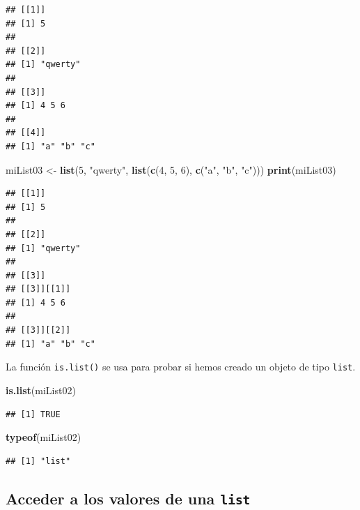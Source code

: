 \documentclass[]{book}
\newenvironment{Shaded}{\begin{snugshade}}{\end{snugshade}}
\newcommand{\KeywordTok}[1]{\textcolor[rgb]{0.13,0.29,0.53}{\textbf{#1}}}
\newcommand{\DecValTok}[1]{\textcolor[rgb]{0.00,0.00,0.81}{#1}}
\newcommand{\StringTok}[1]{\textcolor[rgb]{0.31,0.60,0.02}{#1}}
\newcommand{\NormalTok}[1]{#1}
\begin{document}
\begin{verbatim}
## [[1]]
## [1] 5
## 
## [[2]]
## [1] "qwerty"
## 
## [[3]]
## [1] 4 5 6
## 
## [[4]]
## [1] "a" "b" "c"
\end{verbatim}

\begin{Shaded}
\begin{Highlighting}[]
\NormalTok{miList03 <-}\StringTok{ }\KeywordTok{list}\NormalTok{(}\DecValTok{5}\NormalTok{, }\StringTok{"qwerty"}\NormalTok{, }\KeywordTok{list}\NormalTok{(}\KeywordTok{c}\NormalTok{(}\DecValTok{4}\NormalTok{, }\DecValTok{5}\NormalTok{, }\DecValTok{6}\NormalTok{), }\KeywordTok{c}\NormalTok{(}\StringTok{"a"}\NormalTok{, }\StringTok{"b"}\NormalTok{, }\StringTok{"c"}\NormalTok{)))}
\KeywordTok{print}\NormalTok{(miList03)}
\end{Highlighting}
\end{Shaded}

\begin{verbatim}
## [[1]]
## [1] 5
## 
## [[2]]
## [1] "qwerty"
## 
## [[3]]
## [[3]][[1]]
## [1] 4 5 6
## 
## [[3]][[2]]
## [1] "a" "b" "c"
\end{verbatim}

La función \texttt{is.list()} se usa para probar si hemos creado un
objeto de tipo \texttt{list}.

\begin{Shaded}
\begin{Highlighting}[]
\KeywordTok{is.list}\NormalTok{(miList02)}
\end{Highlighting}
\end{Shaded}

\begin{verbatim}
## [1] TRUE
\end{verbatim}

\begin{Shaded}
\begin{Highlighting}[]
\KeywordTok{typeof}\NormalTok{(miList02)}
\end{Highlighting}
\end{Shaded}

\begin{verbatim}
## [1] "list"
\end{verbatim}

\subsection{\texorpdfstring{Acceder a los valores de una
\texttt{list}}{Acceder a los valores de una list}}\label{acceder-a-los-valores-de-una-list}
\end{document}
